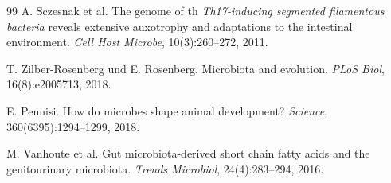 \documentclass[a4paper,12pt]{article}
\theoremstyle{definition}
\begin{document}
\begin{thebibliography}{99}
    A. Sczesnak et al.
    The genome of th\textit{ Th17-inducing segmented filamentous bacteria} reveals extensive auxotrophy and adaptations to the intestinal environment.
    \textit{Cell Host Microbe}, 10(3):260--272, 2011.

    T. Zilber-Rosenberg und E. Rosenberg.
    Microbiota and evolution.
    \textit{PLoS Biol}, 16(8):e2005713, 2018.

    E. Pennisi.
    How do microbes shape animal development?
    \textit{Science}, 360(6395):1294--1299, 2018.

    M. Vanhoute et al.
    Gut microbiota-derived short chain fatty acids and the genitourinary microbiota.
    \textit{Trends Microbiol}, 24(4):283--294, 2016.

\end{thebibliography}
\end{document}
